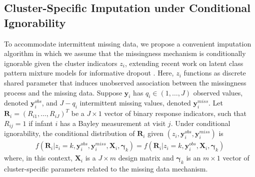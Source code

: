 \documentclass[useAMS,usenatbib,referee]{biom}
\begin{document}
\subsection{Cluster-Specific Imputation under Conditional Ignorability}
\label{s:imp}
To accommodate intermittent missing data, we propose a convenient imputation algorithm in which we assume that the missingness mechanism is conditionally ignorable given the cluster indicators $z_i$, extending recent work on latent class pattern mixture models for informative dropout \citep{roy2007latent}. Here, $z_i$ functions as discrete shared parameter that induces unobserved association between the missingness process and the missing data. Suppose $\mathbf{y}_i$ has $q_i\in (1,\ldots,J)$ observed values, denoted $\mathbf{y}^{obs}_i$, and $J-q_i$ intermittent missing values, denoted $\mathbf{y}^{miss}_i$. Let $\mathbf{R}_i=(R_{i1},\ldots,R_{iJ})^T$ be a $J\times 1$ vector of binary response indicators, such that $R_{ij}=1$ if infant $i$ has a Bayley measurement at visit $j$. Under conditional ignorability, the conditional distribution of $\mathbf{R}_i$ given $(z_i,\mathbf{y}^{obs}_i,\mathbf{y}^{miss}_i)$ is
\begin{eqnarray}
f(\mathbf{R}_i|z_i=k,\mathbf{y}^{obs}_i,\mathbf{y}^{miss}_i,\mathbf{X}_i,\boldsymbol\gamma_k)=f(\mathbf{R}_i|z_i=k,\mathbf{y}^{obs}_i,\mathbf{X}_i,\boldsymbol\gamma_k)\label{eq:response}
\end{eqnarray}
where, in this context, $\mathbf{X}_i$ is a $J\times m$ design matrix and $\boldsymbol\gamma_k$ is an $m\times 1$ vector of cluster-specific parameters related to the missing data mechanism.
\end{document}
